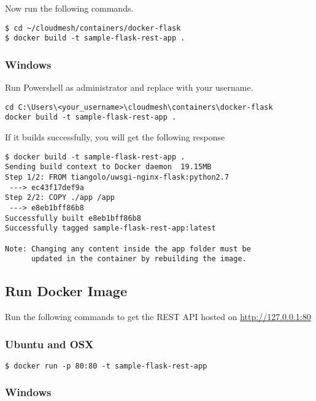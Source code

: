 Now run the following commands.

\begin{lstlisting}
$ cd ~/cloudmesh/containers/docker-flask
$ docker build -t sample-flask-rest-app .
\end{lstlisting}

\subsubsection{Windows}

Run Powershell as administrator and replace with your username.

\begin{lstlisting}
cd C:\Users\<your_username>\cloudmesh\containers\docker-flask
docker build -t sample-flask-rest-app .
\end{lstlisting}

If it builds successfully, you will get the following response

\begin{lstlisting}
$ docker build -t sample-flask-rest-app .
Sending build context to Docker daemon  19.15MB
Step 1/2: FROM tiangolo/uwsgi-nginx-flask:python2.7
 ---> ec43f17def9a
Step 2/2: COPY ./app /app
 ---> e8eb1bff86b8
Successfully built e8eb1bff86b8
Successfully tagged sample-flask-rest-app:latest

Note: Changing any content inside the app folder must be
      updated in the container by rebuilding the image.
\end{lstlisting}

\subsection{Run Docker Image}

Run the following commands to get the REST API hosted on
\url{http://127.0.0.1:80}

\subsubsection{Ubuntu and OSX}

\begin{lstlisting}
$ docker run -p 80:80 -t sample-flask-rest-app
\end{lstlisting}

\subsubsection{Windows}

